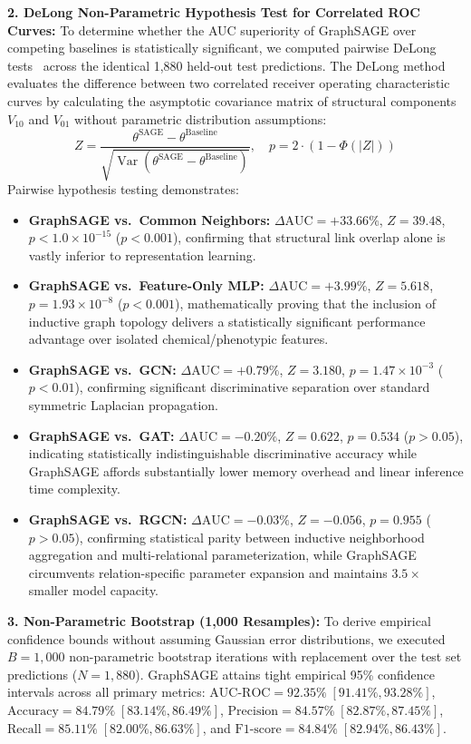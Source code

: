 \documentclass[preprint,12pt]{elsarticle}
\begin{document}
\textbf{2. DeLong Non-Parametric Hypothesis Test for Correlated ROC Curves:} To determine whether the AUC superiority of GraphSAGE over competing baselines is statistically significant, we computed pairwise DeLong tests~\cite{ref_delong} across the identical 1,880 held-out test predictions. The DeLong method evaluates the difference between two correlated receiver operating characteristic curves by calculating the asymptotic covariance matrix of structural components $V_{10}$ and $V_{01}$ without parametric distribution assumptions:
\begin{equation}
Z = \frac{\theta^{\text{SAGE}} - \theta^{\text{Baseline}}}{\sqrt{\operatorname{Var}(\theta^{\text{SAGE}} - \theta^{\text{Baseline}})}}, \quad p = 2 \cdot \left(1 - \Phi(|Z|)\right)
\end{equation}
Pairwise hypothesis testing demonstrates:
\begin{itemize}
    \item \textbf{GraphSAGE vs.\ Common Neighbors:} $\Delta\text{AUC} = +33.66\%$, $Z = 39.48$, $p < 1.0 \times 10^{-15}$ ($p < 0.001$), confirming that structural link overlap alone is vastly inferior to representation learning.
    \item \textbf{GraphSAGE vs.\ Feature-Only MLP:} $\Delta\text{AUC} = +3.99\%$, $Z = 5.618$, $p = 1.93 \times 10^{-8}$ ($p < 0.001$), mathematically proving that the inclusion of inductive graph topology delivers a statistically significant performance advantage over isolated chemical/phenotypic features.
    \item \textbf{GraphSAGE vs.\ GCN:} $\Delta\text{AUC} = +0.79\%$, $Z = 3.180$, $p = 1.47 \times 10^{-3}$ ($p < 0.01$), confirming significant discriminative separation over standard symmetric Laplacian propagation.
    \item \textbf{GraphSAGE vs.\ GAT:} $\Delta\text{AUC} = -0.20\%$, $Z = 0.622$, $p = 0.534$ ($p > 0.05$), indicating statistically indistinguishable discriminative accuracy while GraphSAGE affords substantially lower memory overhead and linear inference time complexity.
    \item \textbf{GraphSAGE vs.\ RGCN:} $\Delta\text{AUC} = -0.03\%$, $Z = -0.056$, $p = 0.955$ ($p > 0.05$), confirming statistical parity between inductive neighborhood aggregation and multi-relational parameterization, while GraphSAGE circumvents relation-specific parameter expansion and maintains $3.5\times$ smaller model capacity.
\end{itemize}

\textbf{3. Non-Parametric Bootstrap (1,000 Resamples):} To derive empirical confidence bounds without assuming Gaussian error distributions, we executed $B = 1,000$ non-parametric bootstrap iterations with replacement over the test set predictions ($N = 1,880$). GraphSAGE attains tight empirical 95\% confidence intervals across all primary metrics: $\text{AUC-ROC} = 92.35\% \; [91.41\%, 93.28\%]$, $\text{Accuracy} = 84.79\% \; [83.14\%, 86.49\%]$, $\text{Precision} = 84.57\% \; [82.87\%, 87.45\%]$, $\text{Recall} = 85.11\% \; [82.00\%, 86.63\%]$, and $\text{F1-score} = 84.84\% \; [82.94\%, 86.43\%]$.
\end{document}
